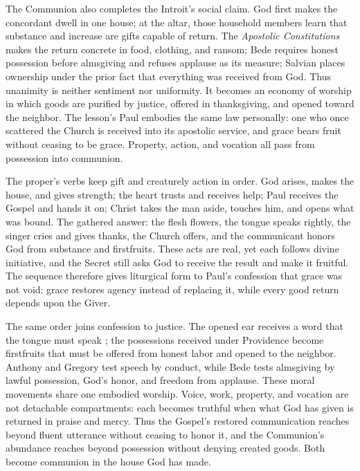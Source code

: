 The Communion also completes the Introit's social claim. God first makes the
concordant dwell in one house; at the altar, those household members learn that
substance and increase are gifts capable of return. The
\emph{Apostolic Constitutions} makes the return concrete in food, clothing,
and ransom; Bede requires honest possession before almsgiving and refuses
applause as its measure; Salvian places ownership under the prior fact that
everything was received from God. Thus unanimity is neither sentiment nor
uniformity. It becomes an economy of worship in which goods are purified by
justice, offered in thanksgiving, and opened toward the neighbor. The lesson's
Paul embodies the same law personally: one who once scattered the Church is
received into its apostolic service, and grace bears fruit without ceasing to
be grace. Property, action, and vocation all pass from possession into
communion.

The proper's verbs keep gift and creaturely action in order. God
arises, makes the house, and gives strength; the heart trusts and receives
help; Paul receives the Gospel and hands it on; Christ takes the man aside,
touches him, and opens what was bound. The gathered answer: the flesh flowers,
the tongue speaks rightly, the singer cries
and gives thanks, the Church offers, and the communicant honors God from
substance and firstfruits. These acts are real, yet each follows divine
initiative, and the Secret still asks God to receive the
result and make it fruitful. The sequence therefore gives liturgical form to
Paul's confession that grace was not void: grace restores agency instead of
replacing it, while every good return depends upon the Giver.

The same order joins confession to justice. The opened ear receives a word
that the tongue must speak ; the possessions received under
Providence become firstfruits that must be offered from honest labor and opened
to the neighbor. Anthony and Gregory test speech by conduct, while Bede tests
almsgiving by lawful possession, God's honor, and freedom from applause. These
moral movements share one embodied worship. Voice, work, property, and vocation
are not detachable compartments: each becomes
truthful when what God has given is returned in praise and mercy. Thus the
Gospel's restored communication reaches beyond fluent utterance without
ceasing to honor it, and the Communion's abundance reaches beyond possession
without denying created goods. Both become communion in the house
God has made.

